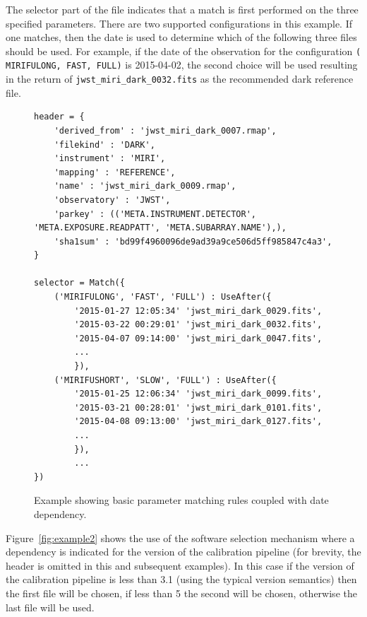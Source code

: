 \documentclass[final,authoryear,5p,times,twocolumn]{elsarticle}
\begin{document}
The selector part of the file indicates that a match is first performed on the 
three specified parameters. There are two supported configurations in this example.
If one matches, then the date is used to determine which of the following three files
should be used.
For example, if the date of the observation for the configuration {\tt (\textquotesingle 
MIRIFULONG\textquotesingle , \textquotesingle FAST\textquotesingle , 
\textquotesingle FULL\textquotesingle )} is 2015-04-02, the second choice 
will be used resulting in the return of {\tt jwst\_miri\_dark\_0032.fits} 
as the recommended dark reference file.


\begin{figure}
\begin{mdframed}
\begin{verbatim}
header = {
    'derived_from' : 'jwst_miri_dark_0007.rmap',
    'filekind' : 'DARK',
    'instrument' : 'MIRI',
    'mapping' : 'REFERENCE',
    'name' : 'jwst_miri_dark_0009.rmap',
    'observatory' : 'JWST',
    'parkey' : (('META.INSTRUMENT.DETECTOR', 'META.EXPOSURE.READPATT', 'META.SUBARRAY.NAME'),),
    'sha1sum' : 'bd99f4960096de9ad39a9ce506d5ff985847c4a3',
}

selector = Match({
    ('MIRIFULONG', 'FAST', 'FULL') : UseAfter({
        '2015-01-27 12:05:34' 'jwst_miri_dark_0029.fits',
        '2015-03-22 00:29:01' 'jwst_miri_dark_0032.fits',
        '2015-04-07 09:14:00' 'jwst_miri_dark_0047.fits',
        ...
        }),
    ('MIRIFUSHORT', 'SLOW', 'FULL') : UseAfter({
        '2015-01-25 12:06:34' 'jwst_miri_dark_0099.fits',
        '2015-03-21 00:28:01' 'jwst_miri_dark_0101.fits',
        '2015-04-08 09:13:00' 'jwst_miri_dark_0127.fits',
        ...
        }),
        ...
})
\end{verbatim}
\end{mdframed}
\caption{Example showing basic parameter matching rules coupled with date dependency.}
\label{fig:example1}
\end{figure}

Figure~\ref{fig:example2} shows the use of the software selection mechanism where a dependency is indicated for the version of the calibration pipeline (for brevity, the header is omitted in this and subsequent examples). In this case if the version of the calibration pipeline is less than 3.1 (using the typical version semantics) then the first file will be chosen, if less than 5 the second will be chosen, otherwise the last file will be used.

\newpage
\end{document}
